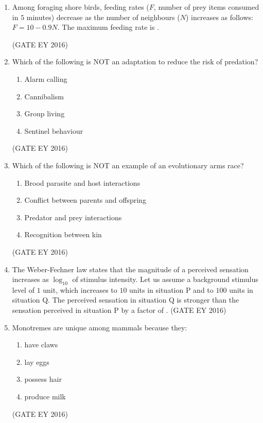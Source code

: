 \documentclass[journal]{IEEEtran}
\begin{document}
\begin{enumerate}
\item Among foraging shore birds, feeding rates ($F$, number of prey items consumed in $5$ minutes) decrease as the number of neighbours ($N$) increases as follows: $F = 10 - 0.9N$. The maximum feeding rate is \underline{\hspace{3cm}}.

\hfill{(GATE EY 2016)}

\item Which of the following is NOT an adaptation to reduce the risk of predation?
\begin{multicols}{2}
\begin{enumerate}
    \item Alarm calling
    \item Cannibalism
    \item Group living
    \item Sentinel behaviour
\end{enumerate}
\end{multicols}
\hfill{(GATE EY 2016)}

\item Which of the following is NOT an example of an evolutionary arms race?
\begin{enumerate}
    \item Brood parasite and host interactions
    \item Conflict between parents and offspring
    \item Predator and prey interactions
    \item Recognition between kin
\end{enumerate}
\hfill{(GATE EY 2016)}

\item The Weber-Fechner law states that the magnitude of a perceived sensation increases as $\log_{10}$ of stimulus intensity. Let us assume a background stimulus level of $1$ unit, which increases to $10$ units in situation P and to $100$ units in situation Q. The perceived sensation in situation Q is stronger than the sensation perceived in situation P by a factor of \underline{\hspace{3cm}}.
\hfill{(GATE EY 2016)}

\item Monotremes are unique among mammals because they:
\begin{multicols}{2}
\begin{enumerate}
    \item have claws
    \item lay eggs
    \item possess hair
    \item produce milk
\end{enumerate}
\end{multicols}
\hfill{(GATE EY 2016)}


\end{enumerate}
\end{document}
